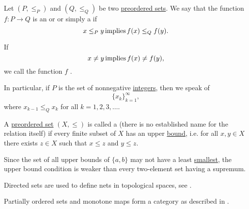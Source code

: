 \begin{definition}\label{def:monotone_map}
  Let \( (P, \leq_P) \) and \( (Q, \leq_Q) \) be two \hyperref[def:preordered_set]{preordered sets}. We say that the function \( f: P \to Q \) is an  or  or simply a  if
  \begin{equation*}
    x \leq_P y \mathop{\text{implies}} f(x) \leq_Q f(y).
  \end{equation*}

  If
  \begin{equation*}
    x \neq y \mathop{\text{implies}} f(x) \neq f(y),
  \end{equation*}
  we call the function \( f \) .

  In particular, if \( P \) is the set of nonnegative \hyperref[def:integers]{integers}, then we speak of 
  \begin{equation*}
    \{ x_k \}_{k=1}^\infty,
  \end{equation*}
  where \( x_{k-1} \leq_Q x_k \) for all \( k = 1, 2, 3, \ldots \).
\end{definition}

\begin{definition}\label{def:directed_set}
  A \hyperref[def:preordered_set]{preordered set} \( (X, \leq) \) is called a  (there is no established name for the relation itself) if every finite subset of \( X \) has an upper \hyperref[def:preordered_set/upper_lower_bound]{bound}, i.e. for all \( x, y \in X \) there exists \( z \in X \) such that \( x \leq z \) and \( y \leq z \).

  Since the set of all upper bounds of \( \{ a, b \} \) may not have a least \hyperref[def:preordered_set/largest_smallest_element]{smallest}, the upper bound condition is weaker than every two-element set having a supremum.

  Directed sets are used to define nets in topological spaces, see .
\end{definition}

\begin{definition}\label{def:category_of_preordered_sets}
  Partially ordered sets and monotone maps form a category as described in .
\end{definition}
